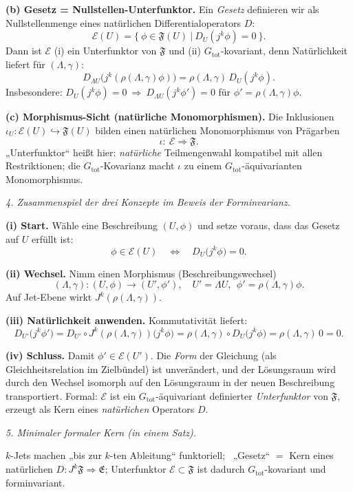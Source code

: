 \documentclass[10pt, letterpaper]{article}
\begin{document}
\textbf{(b) Gesetz = Nullstellen-Unterfunktor.}
Ein \emph{Gesetz} definieren wir als Nullstellenmenge eines natürlichen
Differentialoperators $D$:
\[
\mathcal E(U)=\big\{\ \phi\in\mathfrak F(U)\ \big|\ D_U(j^k\phi)=0\ \big\}.
\]
Dann ist $\mathcal E$ (i) ein Unterfunktor von $\mathfrak F$ und (ii) $G_{\mathrm{tot}}$-kovariant,
denn Natürlichkeit liefert für $(\Lambda,\gamma)$:
\[
D_{\Lambda U}\big(j^k(\rho(\Lambda,\gamma)\phi)\big)
=\rho(\Lambda,\gamma)\,D_U(j^k\phi).
\]
Insbesondere: $D_U(j^k\phi)=0\ \Rightarrow\ D_{\Lambda U}(j^k\phi')=0$
für $\phi'=\rho(\Lambda,\gamma)\phi$.

\textbf{(c) Morphismus-Sicht (natürliche Monomorphismen).}
Die Inklusionen $\iota_U:\mathcal E(U)\hookrightarrow\mathfrak F(U)$ bilden
einen natürlichen Monomorphismus von Prägarben
\[
\iota:\ \mathcal E \Rightarrow \mathfrak F.
\]
„Unterfunktor“ heißt hier: \emph{natürliche} Teilmengenwahl kompatibel mit allen
Restriktionen; die $G_{\mathrm{tot}}$-Kovarianz macht $\iota$ zu einem
$G_{\mathrm{tot}}$-äquivarianten Monomorphismus.

\bigskip
\emph{4. Zusammenspiel der drei Konzepte im Beweis der Forminvarianz.}

\textbf{(i) Start.}
Wähle eine Beschreibung $(U,\phi)$ und setze voraus, dass das Gesetz auf $U$
erfüllt ist:
\[
\phi\in\mathcal E(U)
\quad\Longleftrightarrow\quad
D_U\big(j^k\phi\big)=0.
\]

\textbf{(ii) Wechsel.}
Nimm einen Morphismus (Beschreibungswechsel)
\[
(\Lambda,\gamma):(U,\phi)\longrightarrow (U',\phi'),\quad
U'=\Lambda U,\ \ \phi'=\rho(\Lambda,\gamma)\phi.
\]
Auf Jet-Ebene wirkt $J^k(\rho(\Lambda,\gamma))$.

\textbf{(iii) Natürlichkeit anwenden.}
Kommutativität liefert:
\[
D_{U'}\big(j^k\phi'\big)
= D_{U'}\circ J^k(\rho(\Lambda,\gamma))\big(j^k\phi\big)
= \rho(\Lambda,\gamma)\circ D_U\big(j^k\phi\big)
= \rho(\Lambda,\gamma)\,0
=0.
\]

\textbf{(iv) Schluss.}
Damit $\phi'\in\mathcal E(U')$.  
Die \emph{Form} der Gleichung (als Gleichheitsrelation im Zielbündel) ist unverändert,
und der Lösungsraum wird durch den Wechsel isomorph auf den Lösungsraum in der
neuen Beschreibung transportiert.  
Formal: $\mathcal E$ ist ein $G_{\mathrm{tot}}$-äquivariant definierter \emph{Unterfunktor}
von $\mathfrak F$, erzeugt als Kern eines \emph{natürlichen} Operators $D$.

\bigskip
\emph{5. Minimaler formaler Kern (in einem Satz).}

$k$-Jets machen „bis zur $k$-ten Ableitung“ funktoriell; \
„Gesetz“ $=$ Kern eines natürlichen $D:J^k\mathfrak F\Rightarrow\mathfrak E$; Unterfunktor $\mathcal E\subset\mathfrak F$ ist dadurch $G_{\mathrm{tot}}$-kovariant und forminvariant.
\end{document}
